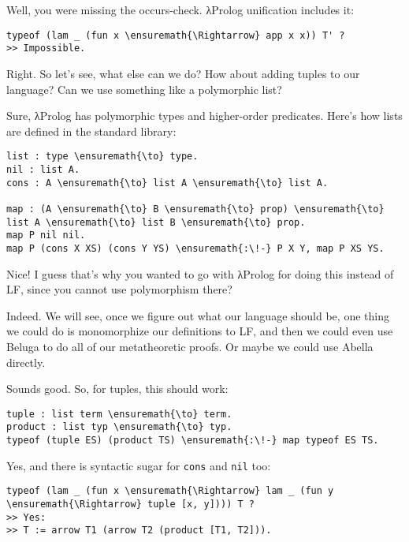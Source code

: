 \heroADVISOR{} Well, you were missing the occurs-check. \foreignlanguage{greek}{λ}Prolog unification
includes it:

\begin{verbatim}
typeof (lam _ (fun x \ensuremath{\Rightarrow} app x x)) T' ?
>> Impossible.
\end{verbatim}

\heroSTUDENT{} Right. So let's see, what else can we do? How about adding
tuples to our language? Can we use something like a polymorphic list?

\heroADVISOR{} Sure, \foreignlanguage{greek}{λ}Prolog has polymorphic types and higher-order
predicates. Here's how lists are defined in the standard library:

\begin{verbatim}
list : type \ensuremath{\to} type.
nil : list A.
cons : A \ensuremath{\to} list A \ensuremath{\to} list A.

map : (A \ensuremath{\to} B \ensuremath{\to} prop) \ensuremath{\to} list A \ensuremath{\to} list B \ensuremath{\to} prop.
map P nil nil.
map P (cons X XS) (cons Y YS) \ensuremath{:\!-} P X Y, map P XS YS.
\end{verbatim}

\heroSTUDENT{} Nice! I guess that's why you wanted to go with \foreignlanguage{greek}{λ}Prolog for
doing this instead of LF, since you cannot use polymorphism there?

\heroADVISOR{} Indeed. We will see, once we figure out what our language
should be, one thing we could do is monomorphize our definitions to LF,
and then we could even use Beluga \citep{beluga-main-reference} to do
all of our metatheoretic proofs. Or maybe we could use Abella
\citep{abella-main-reference} directly.

\heroSTUDENT{} Sounds good. So, for tuples, this should work:

\begin{verbatim}
tuple : list term \ensuremath{\to} term.
product : list typ \ensuremath{\to} typ.
typeof (tuple ES) (product TS) \ensuremath{:\!-} map typeof ES TS.
\end{verbatim}

\heroADVISOR{} Yes, and there is syntactic sugar for \texttt{cons} and
\texttt{nil} too:

\begin{verbatim}
typeof (lam _ (fun x \ensuremath{\Rightarrow} lam _ (fun y \ensuremath{\Rightarrow} tuple [x, y]))) T ?
>> Yes:
>> T := arrow T1 (arrow T2 (product [T1, T2])).
\end{verbatim}

